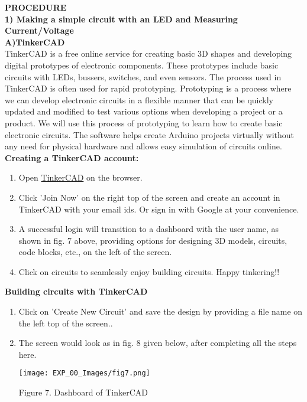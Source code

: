 \documentclass[12pt,a4paper]{article}
\begin{document}
\begin{justify}
\noindent \textbf{\large PROCEDURE}\\[6pt]
\textbf{1)	Making a simple circuit with an LED and Measuring Current/Voltage}\\
\textbf{A)TinkerCAD}\\[6pt]
\noindent TinkerCAD is a free online service for creating basic 3D shapes and developing digital prototypes of electronic components. These prototypes include basic circuits with LEDs, bussers, switches, and even sensors. 
The process used in TinkerCAD is often used for rapid prototyping. Prototyping is a process where we can develop electronic circuits in a flexible manner that can be quickly updated and modified to test various options when developing a project or a product. We will use this process of prototyping to learn how to create basic electronic circuits. The software helps create Arduino projects virtually without any need for physical hardware and allows easy simulation of circuits online.\\[6pt]
\noindent \textbf{Creating a TinkerCAD account:}
\vspace{-5mm}
\begin{enumerate}
 \setlength\itemsep{-0.3em}
\item Open \href{https://www.tinkercad.com/}{TinkerCAD} on the browser.
\item  Click 'Join Now' on the right top of the screen and create an account in TinkerCAD with your email ids. Or sign in with Google at your convenience.
\item  A successful login will transition to a dashboard with the user name, as shown in fig. 7 above, providing options for designing 3D models, circuits, code blocks, etc., on the left of the screen.
\item Click on circuits to seamlessly enjoy building circuits. Happy tinkering!!
\end{enumerate}

\vspace{-5mm}
\noindent \textbf{Building circuits with TinkerCAD }
\vspace{-5mm}
\begin{enumerate}
\setlength\itemsep{-0.3em}
\item Click on 'Create New Circuit' and save the design by providing a file name on the left top of the screen..
\item  The screen would look as in fig. 8 given below, after completing all the steps here.

\begin{center} 
\texttt{[image: EXP\_00\_Images/fig7.png]}
\end{center}
\vspace{-8mm}
\begin{center} {Figure 7. Dashboard of TinkerCAD }\end{center}


\end{enumerate}
\end{justify}
\end{document}
